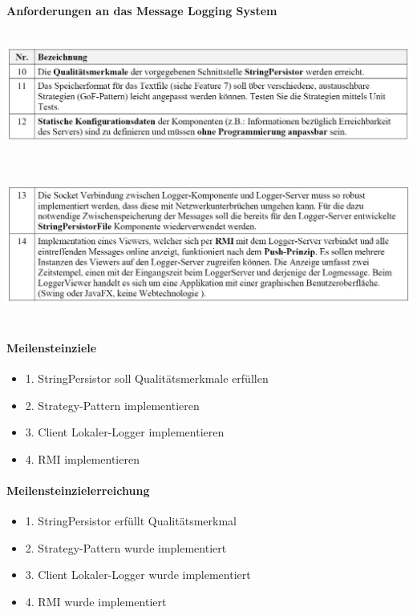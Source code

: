 \documentclass[11pt]{article}
\begin{document}
\paragraph{Anforderungen an das Message Logging System}
\begin{center}
	\includegraphics[height=4cm,keepaspectratio]{images/meilenstein2.1.JPG}
\end{center}
\begin{center}
	\includegraphics[height=5cm,keepaspectratio]{images/meilenstein2.2.JPG}
\end{center}

\paragraph{Meilensteinziele}
\begin{itemize}
	\itemsep0pt
	\item 1. StringPersistor soll Qualitätsmerkmale erfüllen
	\item 2. Strategy-Pattern implementieren
	\item 3. Client Lokaler-Logger implementieren
	\item 4. RMI implementieren

\end{itemize}

\paragraph{Meilensteinzielerreichung}
\begin{itemize}
	\itemsep0pt
	\item 1. StringPersistor erfüllt Qualitätsmerkmal
	\item 2. Strategy-Pattern wurde implementiert
	\item 3. Client Lokaler-Logger wurde implementiert
	\item 4. RMI wurde implementiert

\end{itemize}
\end{document}
